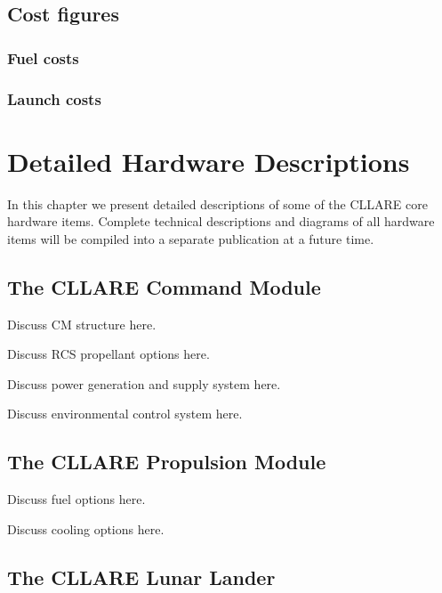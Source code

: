 \documentclass{report}
\begin{document}
\section{Cost figures}

\subsection{Fuel costs}

\subsection{Launch costs}


\chapter{Detailed Hardware Descriptions} \label{chap:detailed}

In this chapter we present detailed descriptions of some of the CLLARE core hardware items.  Complete technical descriptions and diagrams of all hardware items will be compiled into a separate publication at a future time.

\section{The CLLARE Command Module}

Discuss CM structure here.

Discuss RCS propellant options here.

Discuss power generation and supply system here.

Discuss environmental control system here.

\section{The CLLARE Propulsion Module}

Discuss fuel options here.

Discuss cooling options here.

\section{The CLLARE Lunar Lander}
\end{document}
